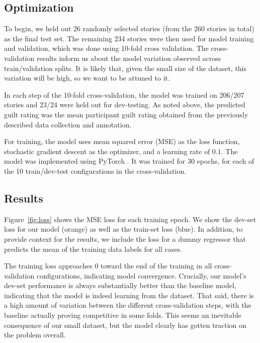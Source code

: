 \documentclass[11pt,a4paper]{article}
\begin{document}
\subsection{Optimization}

To begin, we held out 26 randomly selected stories (from the 260 stories in total) as the final test set. The remaining 234 stories were then used for model training and validation, which was done using 10-fold cross validation. The cross-validation results inform us about the model variation observed across train/validation splits. It is likely that, given the small size of the dataset, this variation will be high, so we want to be attuned to it.

In each step of the 10-fold cross-validation, the model was trained on 206/207 stories and 23/24 were held out for dev-testing. As noted above, the predicted guilt rating was the mean participant guilt rating obtained from the previously described data collection and annotation.

For training, the model uses mean squared error (MSE) as the loss function, stochastic gradient descent as the optimizer, and a learning rate of $0.1$. The model was implemented using PyTorch \citep{Paszke:2017}. It was trained for 30 epochs, for each of the 10 train/dev-test configurations in the cross-validation.


\subsection{Results}

Figure~\ref{fig:loss} shows the MSE loss for each training epoch. We show the dev-set loss for our model (orange) as well as the train-set loss (blue). In addition, to provide context for the results, we include the loss for a dummy regressor that predicts the mean of the training data labels for all cases.

The training loss approaches $0$ toward the end of the training in all cross-validation configurations, indicating model convergence. Crucially, our model's dev-set performance is always substantially better than the baseline model, indicating that the model is indeed learning from the dataset. That said, there is a high amount of variation between the different cross-validation steps, with the baseline actually proving competitive in some folds. This seems an inevitable consequence of our small dataset, but the model clearly has gotten traction on the problem overall.

\end{document}
